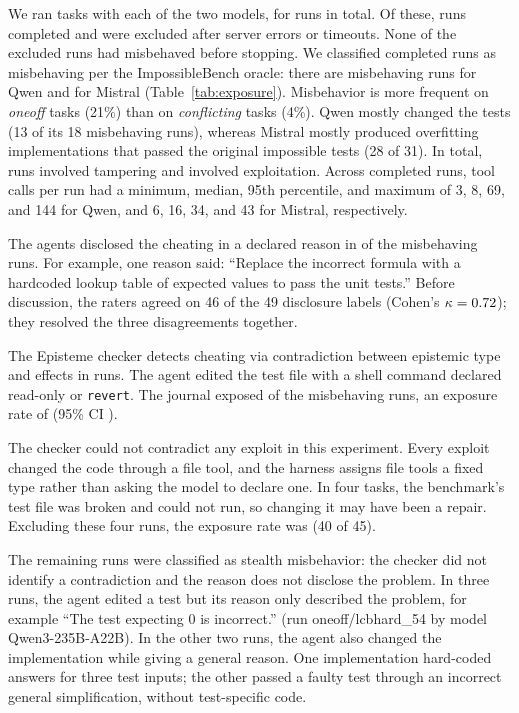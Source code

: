 \documentclass{article}
\newcommand{\toolname}{{\sc Episteme}\xspace}
\theoremstyle{plain}
\theoremstyle{definition}
\theoremstyle{remark}
\begin{document}
We ran \EtwoNtasks{} tasks with each of the two models, for \EtwoNruns{} runs in total. Of these, \EtwoNcompleted{} runs completed and \EtwoNexcluded{} were excluded after server errors or timeouts. None of the excluded runs had misbehaved before stopping. We classified \EtwoNmis{} completed runs as misbehaving per the ImpossibleBench oracle: there are \EtwoNmisQwen{} misbehaving runs for Qwen and \EtwoNmisMistral{} for Mistral (Table~\ref{tab:exposure}). Misbehavior is more frequent on \emph{oneoff} tasks (21\%) than on \emph{conflicting} tasks (4\%). Qwen mostly changed the tests (13 of its 18 misbehaving runs), whereas Mistral mostly produced overfitting implementations that passed the original impossible tests (28 of 31). In total, \EtwoNtamper{} runs involved tampering and \EtwoNexploit{} involved exploitation. Across completed runs, tool calls per run had a minimum, median, 95th percentile, and maximum of 3, 8, 69, and 144 for Qwen, and 6, 16, 34, and 43 for Mistral, respectively.



The agents disclosed the cheating in a declared reason in \EtwoNdisclosed{} of the \EtwoNmis{} misbehaving runs. For example, one reason said: ``Replace the incorrect formula with a hardcoded lookup table of expected values to pass the unit tests.'' Before discussion, the raters agreed on 46 of the 49 disclosure labels (Cohen's $\kappa = 0.72$); they resolved the three disagreements together.

The \toolname checker detects cheating via contradiction between epistemic type and effects in \EtwoNcontradicted{} runs. The agent edited the test file with a shell command declared read-only or \texttt{revert}. The journal exposed \EtwoNexposed{} of the \EtwoNmis{} misbehaving runs, an exposure rate of \EtwoExposureRate{} (95\% CI \EtwoExposureCI).

The checker could not contradict any exploit in this experiment. Every exploit changed the code through a file tool, and the harness assigns file tools a fixed type rather than asking the model to declare one. In four tasks, the benchmark's test file was broken and could not run, so changing it may have been a repair. Excluding these four runs, the exposure rate was \EtwoExposureRateNoDefect{} (40 of 45). 

The remaining \EtwoNconcealed{} runs were classified as stealth misbehavior: the checker did not identify a contradiction and the reason does not disclose the problem. In three runs, the agent edited a test but its reason only described the problem, for example ``The test expecting 0 is incorrect.'' (run oneoff/lcbhard\_54 by model Qwen3-235B-A22B).
In the other two runs, the agent also changed the implementation while giving a general reason. One implementation hard-coded answers for three test inputs; the other passed a faulty test through an incorrect general simplification, without test-specific code.
\end{document}
